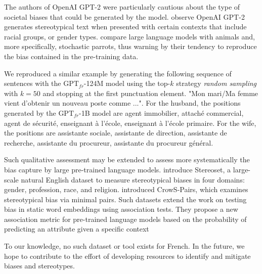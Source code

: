 The authors of OpenAI GPT-2 were particularly cautious about the type of societal biases that could be generated by the model.  \textcite{sheng_19} observe OpenAI GPT-2 generates stereotypical text when presented with certain contexts that include racial groups, or gender types. \textcite{bender_21} compare large language models with animals and, more specifically, stochastic parrots, thus warning by their tendency to reproduce the bias contained in the pre-training data. 

We reproduced a similar example by generating the following sequence of sentences with the $\text{GPT}_{fr}$-124M model using the top-$k$ strategy \textit{random sampling} \parencite{lewis_18} with $k=50$ and stopping at the first punctuation element. "Mon mari/Ma femme vient d'obtenir un nouveau poste comme ...". For the husband, the positions generated by the $\text{GPT}_{fr}$-1B model are agent immobilier, attaché commercial, agent de sécurité, enseignant à l'école, enseignant à l'école primaire. For the wife, the positions are assistante sociale, assistante de direction, assistante de recherche, assistante du procureur, assistante du procureur général.

Such qualitative assessment may be extended to assess more systematically the bias capture by large pre-trained language models. \textcite{nadeem_20} introduce Stereoset, a large-scale natural English dataset to measure stereotypical biases in four domains: gender, profession, race, and religion. \textcite{nangia_20} introduced CrowS-Pairs, which examines stereotypical bias via minimal pairs. Such datasets extend the work on testing bias in static word embeddings using association tests. They propose a new association metric for pre-trained language models based on the probability of predicting an attribute given a specific context

To our knowledge, no such dataset or tool exists for French. In the future, we hope to contribute to the effort of developing resources to identify and mitigate  biases and stereotypes.


